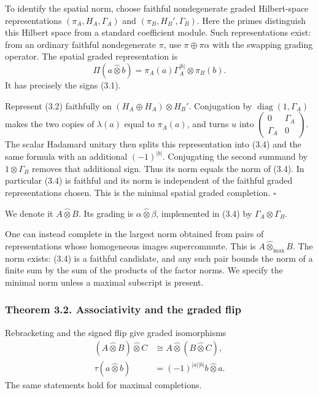 \documentclass[
  11pt,
]{article}
\begin{document}
To identify the spatial norm, choose faithful nondegenerate graded
Hilbert-space representations \((\pi_A,H_A,\Gamma_A)\) and
\((\pi_B,H_B',\Gamma_B)\). Here the primes distinguish this Hilbert
space from a standard coefficient module. Such representations exist:
from an ordinary faithful nondegenerate \(\pi\), use
\(\pi\oplus\pi\alpha\) with the swapping grading operator. The spatial
graded representation is \[
\Pi(a\widehat\otimes b)
=\pi_A(a)\Gamma_A^{|b|}\otimes\pi_B(b).
\tag{3.4}
\] It has precisely the signs (3.1).

Represent (3.2) faithfully on \((H_A\oplus H_A)\otimes H_B'\).
Conjugation by \(\operatorname{diag}(1,\Gamma_A)\) makes the two copies
of \(\lambda(a)\) equal to \(\pi_A(a)\), and turns \(u\) into
\(\begin{pmatrix}0&\Gamma_A\\\Gamma_A&0\end{pmatrix}\). The scalar
Hadamard unitary then splits this representation into (3.4) and the same
formula with an additional \((-1)^{|b|}\). Conjugating the second
summand by \(1\otimes\Gamma_B\) removes that additional sign. Thus its
norm equals the norm of (3.4). In particular (3.4) is faithful and its
norm is independent of the faithful graded representations chosen. This
is the minimal spatial graded completion. \(\square\)

We denote it \(A\widehat\otimes B\). Its grading is
\(\alpha\widehat\otimes\beta\), implemented in (3.4) by
\(\Gamma_A\otimes\Gamma_B\).

One can instead complete in the largest norm obtained from pairs of
representations whose homogeneous images supercommute. This is
\(A\widehat\otimes_{\max}B\). The norm exists: (3.4) is a faithful
candidate, and any such pair bounds the norm of a finite sum by the sum
of the products of the factor norms. We specify the minimal norm unless
a maximal subscript is present.

\subsubsection{Theorem 3.2. Associativity and the graded
flip}\label{theorem-3.2.-associativity-and-the-graded-flip}

Rebracketing and the signed flip give graded isomorphisms \[
\begin{aligned}
(A\widehat\otimes B)\widehat\otimes C
 &\cong A\widehat\otimes(B\widehat\otimes C),\\
\tau(a\widehat\otimes b)
 &=(-1)^{|a||b|}b\widehat\otimes a.
\end{aligned}
\tag{3.5}
\] The same statements hold for maximal completions.
\end{document}
